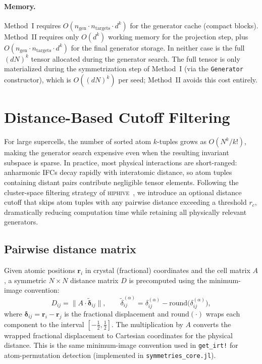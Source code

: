 \documentclass[twocolumn,amsmath,amssymb,aps,prb,10pt,floatfix]{revtex4-2}
\begin{document}
\paragraph{Memory.}
Method~I requires $O(n_{\text{gen}} \cdot n_{\text{targets}} \cdot d^k)$ for the generator cache (compact blocks).
Method~II requires only $O(d^k)$ working memory for the projection step, plus $O(n_{\text{gen}} \cdot n_{\text{targets}} \cdot d^k)$ for the final generator storage.
In neither case is the full $(dN)^k$ tensor allocated during the generator search.
The full tensor is only materialized during the symmetrization step of Method~I (via the \texttt{Generator} constructor), which is $O((dN)^k)$ per seed; Method~II avoids this cost entirely.


\section{Distance-Based Cutoff Filtering}
\label{sec:cutoff}

For large supercells, the number of sorted atom $k$-tuples grows as $O(N^k / k!)$, making the generator search expensive even when the resulting invariant subspace is sparse.
In practice, most physical interactions are short-ranged: anharmonic IFCs decay rapidly with interatomic distance, so atom tuples containing distant pairs contribute negligible tensor elements.
Following the cluster-space filtering strategy of \textsc{hiphive}~\cite{Eriksson2019,Fransson2020}, we introduce an optional distance cutoff that skips atom tuples with any pairwise distance exceeding a threshold $r_c$, dramatically reducing computation time while retaining all physically relevant generators.

\subsection{Pairwise distance matrix}

Given atomic positions $\mathbf{r}_i$ in crystal (fractional) coordinates and the cell matrix $A$, a symmetric $N \times N$ distance matrix $D$ is precomputed using the minimum-image convention:
\begin{equation}
D_{ij} = \bigl\| A \cdot \tilde{\boldsymbol{\delta}}_{ij} \bigr\|,
\qquad
\tilde{\delta}_{ij}^{(\alpha)} = \delta_{ij}^{(\alpha)} - \mathrm{round}\bigl(\delta_{ij}^{(\alpha)}\bigr),
\label{eq:min_image_dist}
\end{equation}
where $\boldsymbol{\delta}_{ij} = \mathbf{r}_i - \mathbf{r}_j$ is the fractional displacement and $\mathrm{round}(\cdot)$ wraps each component to the interval $[-\tfrac{1}{2}, \tfrac{1}{2}]$.
The multiplication by $A$ converts the wrapped fractional displacement to Cartesian coordinates for the physical distance.
This is the same minimum-image convention used in \texttt{get\_irt!} for atom-permutation detection (implemented in \texttt{symmetries\_core.jl}).
\end{document}
